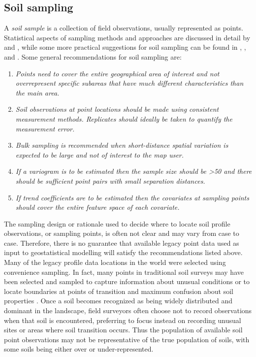 \documentclass[graybox,natbib,nospthms,UStrade]{svmono}
\begin{document}
\hypertarget{soil-sampling}{%
\subsection{Soil sampling}\label{soil-sampling}}

A \emph{soil sample} is a collection of field observations, usually
represented as points. Statistical aspects of sampling methods and
approaches are discussed in detail by \citet{schabenberger2005statistical} and
\citet{deGruijter2006sampling}, while some more practical suggestions for soil
sampling can be found in \citet{pansu2001soil}
\citet{Webster2001Wiley}, \citet{tan2005soil}, and \citet{Legros2006SP}. Some general
recommendations for soil sampling are:

\begin{enumerate}
\def\labelenumi{\arabic{enumi}.}
\item
  \emph{Points need to cover the entire geographical area of interest and
  not overrepresent specific subareas that have much different
  characteristics than the main area.}
\item
  \emph{Soil observations at point locations should be made using
  consistent measurement methods. Replicates should ideally be taken
  to quantify the measurement error.}
\item
  \emph{Bulk sampling is recommended when short-distance spatial variation
  is expected to be large and not of interest to the map user.}
\item
  \emph{If a variogram is to be estimated then the sample size should be
  \textgreater{}50 and there should be sufficient point pairs with small
  separation distances.}
\item
  \emph{If trend coefficients are to be estimated then the covariates at
  sampling points should cover the entire feature space of
  each covariate.}
\end{enumerate}

The sampling design or rationale used to decide where to locate soil
profile observations, or sampling points, is often not clear and may vary
from case to case. Therefore, there is no guarantee that available legacy
point data used as input to geostatistical modelling will satisfy the
recommendations listed above. Many of the legacy profile data locations in the
world were selected using convenience sampling. In fact, many
points in traditional soil surveys may have been selected and sampled to
capture information about unusual conditions or to locate boundaries at
points of transition and maximum confusion about soil properties
\citep{Legros2006SP}. Once a soil becomes recognized as being widely
distributed and dominant in the landscape, field surveyors often choose
not to record observations when that soil is encountered, preferring to
focus instead on recording unusual sites or areas where soil transition
occurs. Thus the population of available soil point observations may not
be representative of the true population of soils, with some soils being
either over or under-represented.
\end{document}
